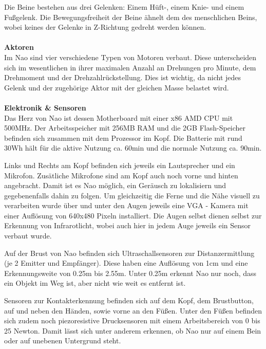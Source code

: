 Die Beine bestehen aus drei Gelenken: Einem Hüft-, einem Knie- und einem Fußgelenk. Die Bewegungsfreiheit der Beine ähnelt dem des menschlichen Beins, wobei keines der Gelenke in Z-Richtung gedreht werden können.
\\
\\
\textbf{Aktoren}
\\
Im Nao sind vier verschiedene Typen von Motoren verbaut. Diese unterscheiden sich im wesentlichen in ihrer maximalen Anzahl an Drehungen pro Minute, dem Drehmoment und der Drehzahlrückstellung. Dies ist wichtig, da nicht jedes Gelenk und der zugehörige Aktor mit der gleichen Masse belastet wird.
\\
\\
\textbf{Elektronik \& Sensoren}
\\
Das Herz von Nao ist dessen Motherboard mit einer x86 AMD CPU mit 500MHz. Der Arbeitsspeicher mit 256MB RAM und die 2GB Flash-Speicher befinden sich zusammen mit dem Prozessor im Kopf.  Die Batterie mit rund 30Wh hält für die aktive Nutzung ca. 60min und die normale Nutzung ca. 90min. 

Links und Rechts am Kopf befinden sich jeweils ein Lautsprecher und ein Mikrofon. Zusätliche Mikrofone sind am Kopf auch noch vorne und hinten angebracht. Damit ist es Nao möglich, ein Geräusch zu lokalisiern und gegebenenfalls dahin zu folgen. Um gleichzeitig die Ferne und die Nähe visuell zu verarbeiten wurde über und unter den Augen jeweils eine VGA - Kamera mit einer Auflösung von 640x480 Pixeln installiert. Die Augen selbst dienen selbst zur Erkennung von Infrarotlicht, wobei auch hier in jedem Auge jeweils ein Sensor verbaut wurde.

Auf der Brust von Nao befinden sich Ultraschallsensoren zur Distanzermittlung (je 2 Emitter und Empfänger). Diese haben eine Auflösung von 1cm und eine Erkennungsweite von 0.25m bis 2.55m. Unter 0.25m erkennt Nao nur noch, dass ein Objekt im Weg ist, aber nicht wie weit es entfernt ist.

Sensoren zur Kontakterkennung befinden sich auf dem Kopf, dem Brustbutton, auf und neben den Händen, sowie vorne an den Füßen. Unter den Füßen befinden sich zudem noch piezoresistive Drucksensoren mit einem Arbeitsbereich von 0 bis 25 Newton. Damit lässt sich unter anderem erkennen, ob Nao nur auf einem Bein oder auf unebenen Untergrund steht.




